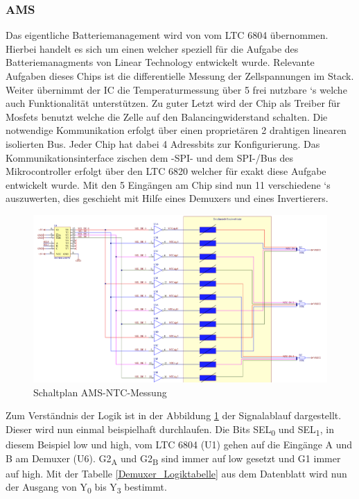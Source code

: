 \subsubsection{\ac{AMS}}
Das eigentliche Batteriemanagement wird von vom LTC 6804 übernommen. Hierbei handelt es sich um einen  welcher speziell für die Aufgabe des Batteriemanagments von Linear Technology entwickelt wurde. Relevante Aufgaben dieses Chips ist die differentielle Messung der Zellspannungen im Stack. Weiter übernimmt der \ac{IC} die Temperaturmessung über 5 frei nutzbare `s welche auch  Funktionalität unterstützen. Zu guter Letzt wird der Chip als Treiber für Mosfets benutzt welche die Zelle auf den Balancingwiderstand schalten. Die notwendige Kommunikation erfolgt über einen proprietären 2 drahtigen linearen isolierten  Bus. Jeder Chip hat dabei 4 Adressbits zur Konfigurierung. Das Kommunikationsinterface zischen dem -\ac{SPI}- und dem \ac{SPI}-/Bus des Mikrocontroller erfolgt über den LTC 6820 welcher für exakt diese Aufgabe entwickelt wurde. Mit den 5 Eingängen am Chip sind nun 11 verschiedene `s auszuwerten, dies geschieht mit Hilfe eines Demuxers und eines Invertierers.
\begin{figure}
	\centering
	\includegraphics[width=0.7\linewidth]{bilder/AMS_NTC_Measurement}
	\caption{Schaltplan \ac{AMS}-\ac{NTC}-Messung}
	\label{fig:amsntcmeasurement}
\end{figure}

Zum Verständnis der Logik ist in der Abbildung \ref{fig:amsntcmeasurement} der Signalablauf dargestellt. Dieser wird nun einmal beispielhaft durchlaufen. Die Bits SEL\textsubscript{0} und SEL\textsubscript{1}, in diesem Beispiel low und high, vom LTC 6804 (U1) gehen auf die Eingänge A und B am Demuxer (U6). G2\textsubscript{A} und G2\textsubscript{B} sind immer auf low gesetzt und G1 immer auf high. Mit der Tabelle \ref{Demuxer_Logiktabelle} aus dem Datenblatt wird nun der Ausgang von Y\textsubscript{0} bis Y\textsubscript{3} bestimmt.

